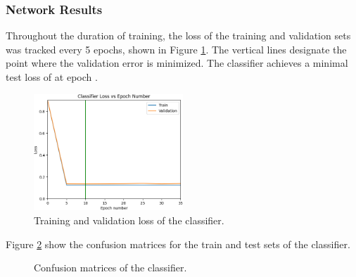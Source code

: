 \documentclass[a4paper, 12pt, titlepage]{article}
\newcommand{\figRef}[1]{Figure \ref{#1}}
\begin{document}
  \subsubsection{Network Results}
  \par Throughout the duration of training, the loss of the training and
  validation sets was tracked every 5 epochs, shown in \figRef{fig:loss}.
  The vertical lines designate the point where the validation error is
  minimized.
  The classifier achieves a minimal test loss of
  \unskip{} at epoch
  \unskip{}.
  \begin{figure}[htb]
    \centering
    \includegraphics[width=0.5\textwidth]{images/loss_graph.png}
    \caption{Training and validation loss of the classifier.}
    \label{fig:loss}
  \end{figure}
  \par \figRef{fig:conf} show the confusion matrices for the train and
  test sets of the classifier.
  \begin{figure}[htb]
    \centering
    \caption{Confusion matrices of the classifier.}
    \label{fig:conf}
  \end{figure}
\end{document}
